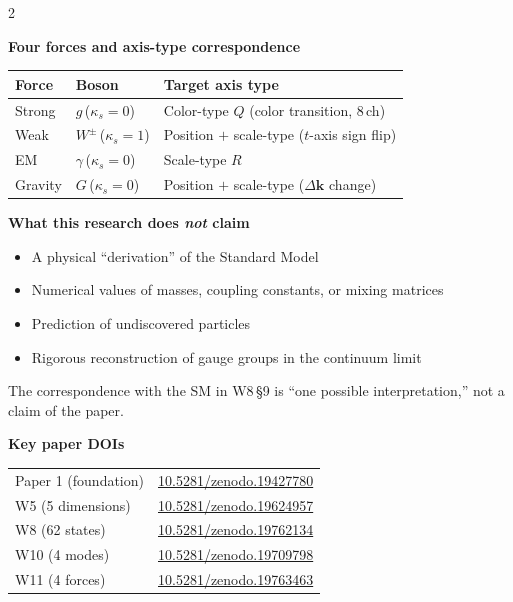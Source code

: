 \documentclass[9pt,a4paper]{article}
\begin{document}
\begin{multicols}{2}
\columnbreak

\textbf{Four forces and axis-type correspondence}

\vspace{1pt}
\begin{center}
\footnotesize
\begin{tabular}{@{}lll@{}}
\toprule
Force & Boson & Target axis type \\
\midrule
Strong & $g$\,($\kappa_s{=}0$) & Color-type $Q$ (color transition, 8\,ch) \\
Weak & $W^{\pm}$\,($\kappa_s{=}1$) & Position $+$ scale-type ($t$-axis sign flip) \\
EM & $\gamma$\,($\kappa_s{=}0$) & Scale-type $R$ \\
Gravity & $G$\,($\kappa_s{=}0$) & Position $+$ scale-type ($\Delta\mathbf{k}$ change) \\
\bottomrule
\end{tabular}
\end{center}

\vspace{6pt}
\textbf{What this research does \emph{not} claim}

\vspace{1pt}
\begin{itemize}[topsep=1pt]
\item A physical ``derivation'' of the Standard Model
\item Numerical values of masses, coupling constants, or mixing matrices
\item Prediction of undiscovered particles
\item Rigorous reconstruction of gauge groups in the continuum limit
\end{itemize}

\vspace{1pt}
{\footnotesize The correspondence with the SM in W8\,\S9 is ``one possible interpretation,'' not a claim of the paper.}

\vspace{6pt}
\textbf{Key paper DOIs}

\vspace{1pt}
{\footnotesize
\begin{tabular}{@{}ll@{}}
Paper 1 (foundation) & \href{https://doi.org/10.5281/zenodo.19427780}{10.5281/zenodo.19427780} \\
W5 (5 dimensions) & \href{https://doi.org/10.5281/zenodo.19624957}{10.5281/zenodo.19624957} \\
W8 (62 states) & \href{https://doi.org/10.5281/zenodo.19762134}{10.5281/zenodo.19762134} \\
W10 (4 modes) & \href{https://doi.org/10.5281/zenodo.19709798}{10.5281/zenodo.19709798} \\
W11 (4 forces) & \href{https://doi.org/10.5281/zenodo.19763463}{10.5281/zenodo.19763463} \\
\end{tabular}
}

\end{multicols}
\end{document}
